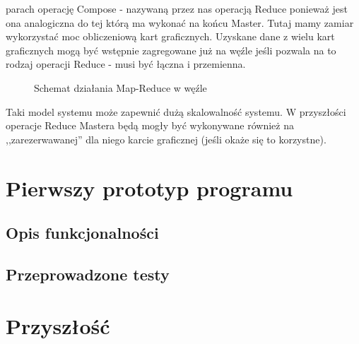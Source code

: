 \documentclass[paper=a4, fontsize=11pt]{scrartcl} %
\numberwithin{equation}{section} %
\numberwithin{figure}{section} %
\numberwithin{table}{section} %
\begin{document}
\begin{itemize}
		parach operację Compose - nazywaną przez nas operacją Reduce ponieważ jest ona analogiczna do tej którą ma wykonać na końcu Master. Tutaj mamy zamiar wykorzystać
		moc obliczeniową kart graficznych. Uzyskane dane z wielu kart graficznych mogą być wstępnie zagregowane już na węźle jeśli pozwala na to rodzaj operacji Reduce - musi być łączna i przemienna.
		\begin{figure}[t]
			\begin{center}
				\caption{Schemat działania Map-Reduce w węźle}
			\end{center}
		\end{figure}
\end{itemize}
\clearpage

Taki model systemu może zapewnić dużą skalowalność systemu. W przyszłości operacje Reduce Mastera będą mogły być wykonywane również na ,,zarezerwawanej'' dla niego 
karcie graficznej (jeśli okaże się to korzystne).

\section{Pierwszy prototyp programu}
	\subsection{Opis funkcjonalności}
	\subsection{Przeprowadzone testy}

\section{Przyszłość}
\end{document}
